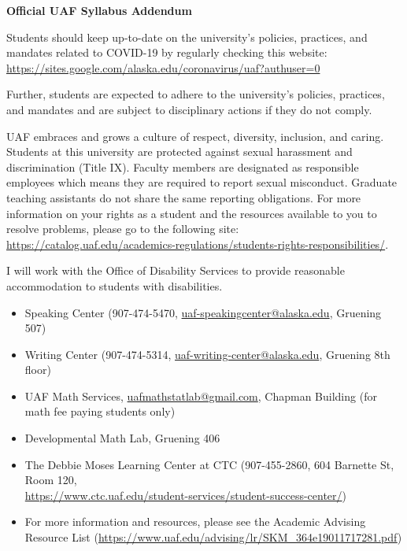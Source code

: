 \documentclass[12pt]{article}
\def\mailto#1{\href{mailto:#1}{#1}}
\begin{document}
\textbf{\large{Official UAF Syllabus Addendum}}
 
\hfill

 Students should keep up-to-date on the university's policies, practices, and mandates related to COVID-19 by regularly checking this website: \url{https://sites.google.com/alaska.edu/coronavirus/uaf?authuser=0}

Further, students are expected to adhere to the university's policies, practices, and mandates and are subject to disciplinary actions if they do not comply.

 UAF embraces and grows a culture of respect, diversity, inclusion, and caring. Students at this university are protected against sexual harassment and discrimination (Title IX). Faculty members are designated as responsible employees which means they are required to report sexual misconduct. Graduate teaching assistants do not share the same reporting obligations. For more information on your rights as a student and the resources available to you to resolve problems, please go to the following site: \url{https://catalog.uaf.edu/academics-regulations/students-rights-responsibilities/}.

 I will work with the Office of Disability Services to provide reasonable accommodation to students with disabilities.

\begin{itemize}
\setlength\itemsep{0em}
        \item Speaking Center (907-474-5470,
        \mailto{uaf-speakingcenter@alaska.edu}, Gruening 507)
\item Writing Center (907-474-5314, \mailto{uaf-writing-center@alaska.edu}, Gruening 8th floor)
\item UAF Math Services, \mailto{uafmathstatlab@gmail.com}, Chapman Building (for math fee paying students only)
\item Developmental Math Lab, Gruening 406
\item The Debbie Moses Learning Center at CTC (907-455-2860, 604 Barnette St, Room 120,\\ \mailto{https://www.ctc.uaf.edu/student-services/student-success-center/})
\item For more information and resources, please see the Academic Advising Resource List (\url{https://www.uaf.edu/advising/lr/SKM_364e19011717281.pdf})
\end{itemize}
\end{document}
